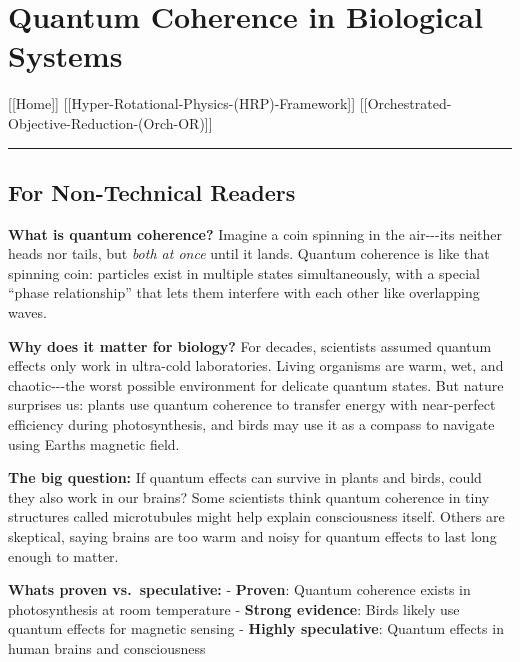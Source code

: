 \section{Quantum Coherence in Biological
Systems}\label{quantum-coherence-in-biological-systems}

{[}{[}Home{]}{]} \textbar{}
{[}{[}Hyper-Rotational-Physics-(HRP)-Framework{]}{]} \textbar{}
{[}{[}Orchestrated-Objective-Reduction-(Orch-OR){]}{]}

\begin{center}\rule{0.5\linewidth}{0.5pt}\end{center}

\subsection{\texorpdfstring{For Non-Technical Readers
}{For Non-Technical Readers }}\label{for-non-technical-readers}

\textbf{What is quantum coherence?} Imagine a coin spinning in the
air-\/-\/-it\textquotesingle s neither heads nor tails, but \emph{both
at once} until it lands. Quantum coherence is like that spinning coin:
particles exist in multiple states simultaneously, with a special
``phase relationship'' that lets them interfere with each other like
overlapping waves.

\textbf{Why does it matter for biology?} For decades, scientists assumed
quantum effects only work in ultra-cold laboratories. Living organisms
are warm, wet, and chaotic-\/-\/-the worst possible environment for
delicate quantum states. But nature surprises us: plants use quantum
coherence to transfer energy with near-perfect efficiency during
photosynthesis, and birds may use it as a compass to navigate using
Earth\textquotesingle s magnetic field.

\textbf{The big question:} If quantum effects can survive in plants and
birds, could they also work in our brains? Some scientists think quantum
coherence in tiny structures called microtubules might help explain
consciousness itself. Others are skeptical, saying brains are too warm
and noisy for quantum effects to last long enough to matter.

\textbf{What\textquotesingle s proven vs.~speculative:} -
\textbf{Proven}: Quantum coherence exists in photosynthesis at room
temperature - \textbf{Strong evidence}: Birds likely use quantum effects
for magnetic sensing - \textbf{Highly speculative}: Quantum effects in
human brains and consciousness

